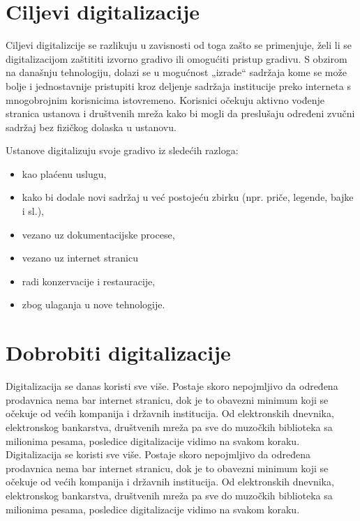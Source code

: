 \section{Ciljevi digitalizacije}
\label{sec:naslovN}

Ciljevi digitalizcije se razlikuju u zavisnosti od toga zašto se primenjuje, želi li se
digitalizacijom zaštititi izvorno gradivo ili omogućiti pristup gradivu. S obzirom na današnju tehnologiju, dolazi se u mogućnost „izrade“ sadržaja kome se može bolje i
jednostavnije pristupiti kroz deljenje sadržaja institucije preko interneta s mnogobrojnim korisnicima istovremeno. Korisnici očekuju aktivno vođenje stranica ustanova i društvenih
mreža kako bi mogli da preslušaju određeni zvučni sadržaj bez fizičkog dolaska u ustanovu.
 
Ustanove digitalizuju svoje gradivo iz sledećih razloga:

\begin{itemize}
  \item kao plaćenu uslugu,
  \item kako bi dodale novi sadržaj u već postojeću zbirku (npr. priče, legende, bajke i sl.),
  \item vezano uz dokumentacijske procese,
  \item vezano uz internet stranicu
  \item radi konzervacije i restauracije,
  \item zbog ulaganja u nove tehnologije.
\end{itemize}

\section{Dobrobiti digitalizacije}
\label{sec:naslovM}

Digitalizacija se danas koristi sve više. Postaje skoro nepojmljivo da određena prodavnica nema bar internet stranicu, dok je to obavezni minimum koji se očekuje od većih kompanija i državnih institucija. Od elektronskih dnevnika, elektronskog bankarstva, društvenih mreža pa sve do muzočkih biblioteka sa milionima pesama, posledice digitalizacije vidimo na svakom koraku. 
Digitalizacija se koristi sve više. Postaje skoro nepojmljivo da određena prodavnica nema bar internet stranicu, dok je to obavezni minimum koji se očekuje od većih kompanija i državnih institucija. Od elektronskih dnevnika, elektronskog bankarstva, društvenih mreža pa sve do muzočkih biblioteka sa milionima pesama, posledice digitalizacije vidimo na svakom koraku. 

